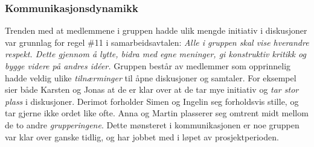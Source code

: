 \subsubsection{Kommunikasjonsdynamikk}

Trenden med at medlemmene i gruppen hadde ulik mengde initiativ i diskusjoner var grunnlag for regel \#11 i samarbeidsavtalen: \textit{Alle i gruppen skal vise hverandre respekt.
Dette gjennom å lytte, bidra med egne meninger, gi konstruktiv kritikk og bygge videre på andres id\'{e}er.} 
Gruppen består av medlemmer som opprinnelig hadde veldig ulike \textit{tilnærminger} til åpne diskusjoner og samtaler.
For eksempel sier både Karsten og Jonas at de er klar over at de tar mye initiativ og \textit{tar stor plass} i diskusjoner.
Derimot forholder Simen og Ingelin seg forholdsvis stille, og tar gjerne ikke ordet like ofte.
Anna og Martin plasserer seg omtrent midt mellom de to andre \textit{grupperingene}.
Dette mønsteret i kommunikasjonen er noe gruppen var klar over ganske tidlig, og har jobbet med i løpet av prosjektperioden.

